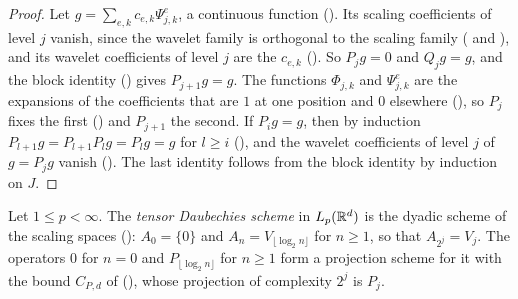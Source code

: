 \begin{proof}
\leanok
{}
Let $g = \sum_{e,k} c_{e,k} \Psi^e_{j,k}$, a continuous function
(). Its scaling coefficients of level $j$ vanish, since the
wavelet family is orthogonal to the scaling family ( and
), and its wavelet coefficients of level $j$ are the
$c_{e,k}$ (). So $P_j g = 0$ and $Q_j g = g$, and the block identity
() gives $P_{j+1} g = g$. The functions $\Phi_{j,k}$ and
$\Psi^e_{j,k}$ are the expansions of the coefficients that are $1$ at one position and $0$
elsewhere (), so $P_j$ fixes the first
() and $P_{j+1}$ the second. If $P_i g = g$, then by induction
$P_{l+1} g = P_{l+1} P_l g = P_l g = g$ for $l \geq i$ (), and the
wavelet coefficients of level $j$ of $g = P_j g$ vanish (). The last
identity follows from the block identity by induction on $J$.
\end{proof}

\begin{definition}
\label{def:daub-rd-scheme}
\leanok
{}
Let $1 \leq p < \infty$. The \emph{tensor Daubechies scheme} in $L_p(\mathbb{R}^d)$ is the dyadic scheme
of the scaling spaces (): $A_0 = \{0\}$ and $A_n = V_{\lfloor \log_2 n \rfloor}$
for $n \geq 1$, so that $A_{2^j} = V_j$. The operators $0$ for $n = 0$ and
$P_{\lfloor \log_2 n \rfloor}$ for $n \geq 1$ form a projection scheme for it with the bound
$C_{P,d}$ of  (), whose projection of
complexity $2^j$ is $P_j$.
\end{definition}

